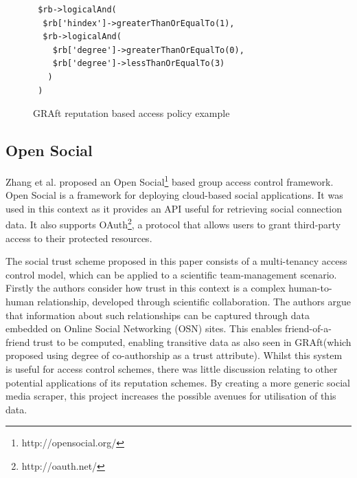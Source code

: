 

\begin{center}
\begin{figure}[h!]
\begin{verbatim}
 $rb->logicalAnd(
  $rb['hindex']->greaterThanOrEqualTo(1),
  $rb->logicalAnd(
    $rb['degree']->greaterThanOrEqualTo(0),
    $rb['degree']->lessThanOrEqualTo(3)
   )
 )
\end{verbatim}
\caption{GRAft reputation based access policy example}
\label{fig:GRAFT}
\end{figure}
\end{center}


\subsection{Open Social}

Zhang et al. \cite{zhang2012open} proposed an Open Social\footnote{http://opensocial.org/} based group access control framework. Open Social is a framework for deploying cloud-based social applications. It was used in this context as it provides an API useful for retrieving social connection data. It also supports OAuth\footnote{http://oauth.net/}, a protocol that allows users to grant third-party access to their protected resources.

The social trust scheme proposed in this paper consists of a multi-tenancy access control model, which can be applied to a scientific team-management scenario. Firstly the authors consider how trust in this context is a complex human-to-human relationship, developed through scientific collaboration. The authors argue that information about such relationships can be captured through data embedded on Online Social Networking (OSN) sites. This enables friend-of-a-friend trust to be computed, enabling transitive data as also seen in GRAft(which proposed using degree of co-authorship as a trust attribute). Whilst this system is useful for access control schemes, there was little discussion relating to other potential applications of its reputation schemes. By creating a more generic social media scraper, this project increases the possible avenues for utilisation of this data.

